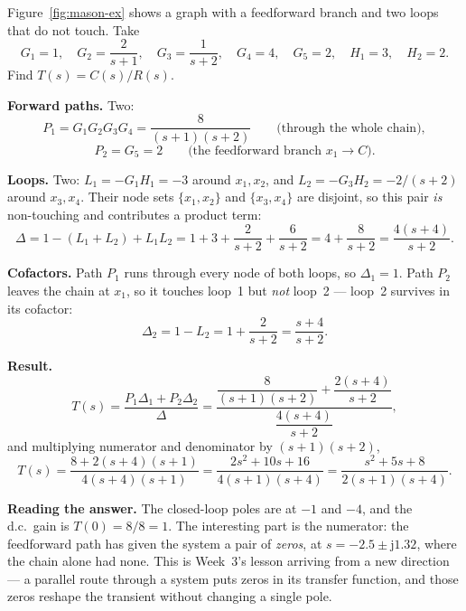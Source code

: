 \documentclass[11pt,a4paper]{article}
\begin{document}
\begin{workedex}[breakable, title={Worked example 4.5 --- two forward paths and a non-touching pair}]
Figure~\ref{fig:mason-ex} shows a graph with a feedforward branch and two
loops that do not touch. Take
\[
  G_1=1,\quad G_2=\frac{2}{s+1},\quad G_3=\frac{1}{s+2},\quad G_4=4,
  \quad G_5=2,\quad H_1=3,\quad H_2=2 .
\]
Find $T(s)=C(s)/R(s)$.

\medskip
\textbf{Forward paths.} Two:
\[
  P_1 = G_1G_2G_3G_4 = \frac{8}{(s+1)(s+2)}
  \qquad\text{(through the whole chain)},
\]
\[
  P_2 = G_5 = 2
  \qquad\text{(the feedforward branch $x_1\to C$)} .
\]

\medskip
\textbf{Loops.} Two: $L_1=-G_1H_1=-3$ around $x_1,x_2$, and
$L_2=-G_3H_2=-2/(s+2)$ around $x_3,x_4$. Their node sets
$\{x_1,x_2\}$ and $\{x_3,x_4\}$ are disjoint, so this pair \emph{is}
non-touching and contributes a product term:
\[
  \Delta = 1-(L_1+L_2)+L_1L_2
   = 1+3+\frac{2}{s+2}+\frac{6}{s+2}
   = 4+\frac{8}{s+2}
   = \frac{4(s+4)}{s+2} .
\]

\medskip
\textbf{Cofactors.} Path $P_1$ runs through every node of both loops, so
$\Delta_1=1$. Path $P_2$ leaves the chain at $x_1$, so it touches loop~1 but
\emph{not} loop~2 --- loop~2 survives in its cofactor:
\[
  \Delta_2 = 1 - L_2 = 1+\frac{2}{s+2}=\frac{s+4}{s+2} .
\]

\medskip
\textbf{Result.}
\[
  T(s)=\frac{P_1\Delta_1+P_2\Delta_2}{\Delta}
   =\frac{\dfrac{8}{(s+1)(s+2)}+\dfrac{2(s+4)}{s+2}}
         {\dfrac{4(s+4)}{s+2}} ,
\]
and multiplying numerator and denominator by $(s+1)(s+2)$,
\[
  T(s)=\frac{8+2(s+4)(s+1)}{4(s+4)(s+1)}
   =\frac{2s^{2}+10s+16}{4(s+1)(s+4)}
   =\frac{s^{2}+5s+8}{2(s+1)(s+4)} .
\]

\medskip
\textbf{Reading the answer.} The closed-loop poles are at $-1$ and $-4$, and
the d.c.\ gain is $T(0)=8/8=1$. The interesting part is the numerator: the
feedforward path has given the system a pair of \emph{zeros}, at
$s=-2.5\pm\mathrm{j}1.32$, where the chain alone had none. This is Week~3's
lesson arriving from a new direction --- a parallel route through a system
puts zeros in its transfer function, and those zeros reshape the transient
without changing a single pole.
\end{workedex}
\end{document}
